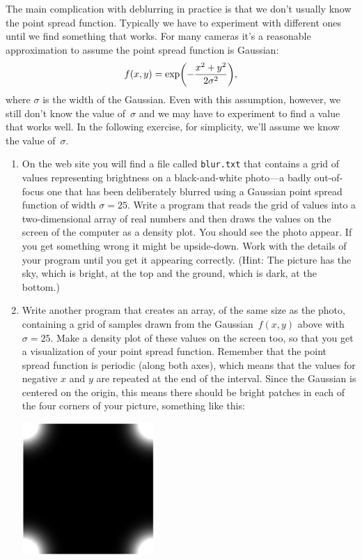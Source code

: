 \documentclass[12pt]{article}
\begin{document}
\begin{exercises}
The main complication with deblurring in practice is that we don't usually
know the point spread function.  Typically we have to experiment with
different ones until we find something that works.  For many cameras it's a
reasonable approximation to assume the point spread function is Gaussian:
\begin{displaymath}
f(x,y) = \exp\biggl( -{x^2+y^2\over2\sigma^2} \biggr),
\end{displaymath}
where $\sigma$ is the width of the Gaussian.  Even with this assumption,
however, we still don't know the value of~$\sigma$ and we may have to
experiment to find a value that works well.  In the following exercise, for
simplicity, we'll assume we know the value of~$\sigma$.

\begin{enumerate}\setlength{\itemsep}{0pt}
\item On the web site you will find a file called \verb|blur.txt| that
  contains a grid of values representing brightness on a black-and-white
  photo---a badly out-of-focus one that has been deliberately blurred using
  a Gaussian point spread function of width $\sigma=25$.  Write a program
  that reads the grid of values into a two-dimensional array of real
  numbers and then draws the values on the screen of the computer as a
  density plot.  You should see the photo appear.  If you get something
  wrong it might be upside-down.  Work with the details of your program
  until you get it appearing correctly.  (Hint: The picture has the sky,
  which is bright, at the top and the ground, which is dark, at the
  bottom.)
\item Write another program that creates an array, of the same size as the
  photo, containing a grid of samples drawn from the Gaussian~$f(x,y)$
  above with $\sigma=25$.  Make a density plot of these values on the
  screen too, so that you get a visualization of your point spread
  function.  Remember that the point spread function is periodic (along
  both axes), which means that the values for negative $x$ and $y$ are
  repeated at the end of the interval.  Since the Gaussian is centered on
  the origin, this means there should be bright patches in each of the four
  corners of your picture, something like this: \medskip
\begin{center}
\includegraphics[width=5cm,clip=true]{psf.eps}
\end{center}
\smallskip


\end{enumerate}
\end{exercises}
\end{document}
